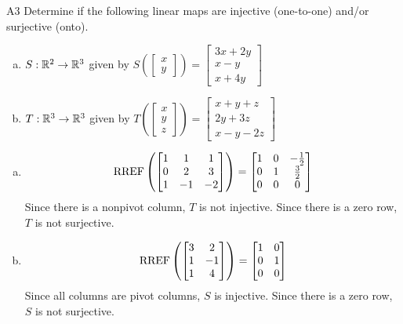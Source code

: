 \begin{problem}{A3}
Determine if the following linear maps are injective (one-to-one) and/or surjective (onto).
\begin{enumerate}[(a)]
\item $S: \mathbb{R}^2 \rightarrow \mathbb{R}^3$ given by $S\left(\begin{bmatrix} x \\ y  \end{bmatrix} \right) = \begin{bmatrix} 3x+2y \\ x-y \\ x+4y \end{bmatrix} $
\item $T: \mathbb{R}^3 \rightarrow \mathbb{R}^3$ given by $T\left(\begin{bmatrix} x \\ y \\ z  \end{bmatrix} \right) = \begin{bmatrix} x+y+z \\ 2y+3z \\ x-y-2z \end{bmatrix} $
\end{enumerate}
\end{problem}

\begin{solution}
\begin{enumerate}[(a)]
\item $$\operatorname{RREF}\left( \begin{bmatrix} 1 &  1 & 1 \\ 0  & 2 & 3 \\ 1  & -1 & -2 \end{bmatrix} \right) = \begin{bmatrix} 1 &  0 & -\frac{1}{2} \\ 0  & 1 & \frac{3}{2} \\ 0& 0 & 0  \end{bmatrix}$$
Since there is a nonpivot column, $T$ is not injective.  Since there is a zero row, $T$ is not surjective.
\item $$\operatorname{RREF} \left( \begin{bmatrix} 3 & 2 \\ 1 & -1 \\ 1 & 4 \end{bmatrix} \right) = \begin{bmatrix} 1 & 0 \\ 0 & 1 \\ 0 & 0 \end{bmatrix}$$
Since all columns are pivot columns, $S$ is injective.  Since there is a zero row, $S$ is not surjective.
\end{enumerate}
\end{solution}




